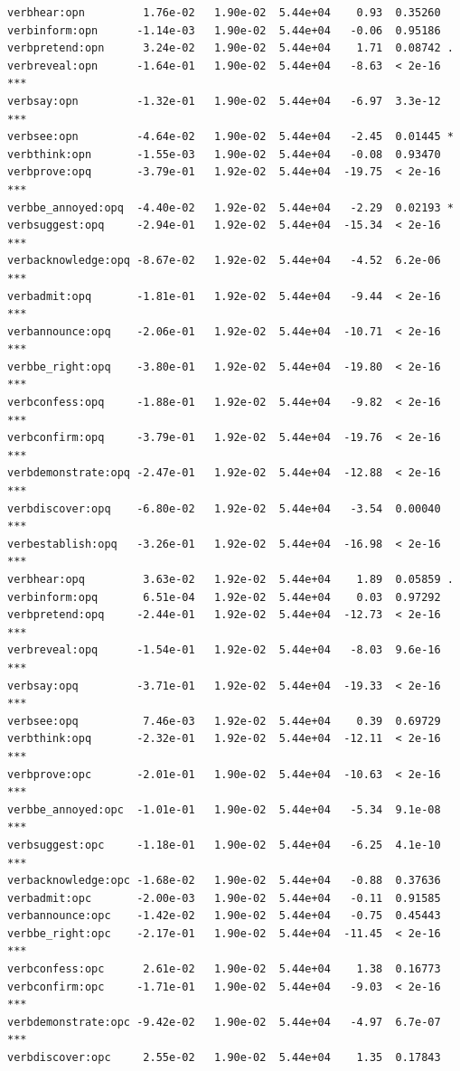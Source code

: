 \documentclass[10pt]{article}\usepackage[]{graphicx}\usepackage[dvipsnames]{xcolor}
\makeatletter
\newenvironment{kframe}{%
 \def\at@end@of@kframe{}%
 \ifinner\ifhmode%
  \def\at@end@of@kframe{\end{minipage}}%
  \begin{minipage}{\columnwidth}%
 \fi\fi%
 \def\FrameCommand##1{\hskip\@totalleftmargin \hskip-\fboxsep
 \colorbox{shadecolor}{##1}\hskip-\fboxsep
     \hskip-\linewidth \hskip-\@totalleftmargin \hskip\columnwidth}%
 \MakeFramed {\advance\hsize-\width
   \@totalleftmargin\z@ \linewidth\hsize
   \@setminipage}}%
 {\par\unskip\endMakeFramed%
 \at@end@of@kframe}
\newenvironment{knitrout}{}{} %
\makeatother
\begin{document}
\begin{knitrout}
\begin{kframe}
\begin{verbatim}
verbhear:opn         1.76e-02   1.90e-02  5.44e+04    0.93  0.35260    
verbinform:opn      -1.14e-03   1.90e-02  5.44e+04   -0.06  0.95186    
verbpretend:opn      3.24e-02   1.90e-02  5.44e+04    1.71  0.08742 .  
verbreveal:opn      -1.64e-01   1.90e-02  5.44e+04   -8.63  < 2e-16 ***
verbsay:opn         -1.32e-01   1.90e-02  5.44e+04   -6.97  3.3e-12 ***
verbsee:opn         -4.64e-02   1.90e-02  5.44e+04   -2.45  0.01445 *  
verbthink:opn       -1.55e-03   1.90e-02  5.44e+04   -0.08  0.93470    
verbprove:opq       -3.79e-01   1.92e-02  5.44e+04  -19.75  < 2e-16 ***
verbbe_annoyed:opq  -4.40e-02   1.92e-02  5.44e+04   -2.29  0.02193 *  
verbsuggest:opq     -2.94e-01   1.92e-02  5.44e+04  -15.34  < 2e-16 ***
verbacknowledge:opq -8.67e-02   1.92e-02  5.44e+04   -4.52  6.2e-06 ***
verbadmit:opq       -1.81e-01   1.92e-02  5.44e+04   -9.44  < 2e-16 ***
verbannounce:opq    -2.06e-01   1.92e-02  5.44e+04  -10.71  < 2e-16 ***
verbbe_right:opq    -3.80e-01   1.92e-02  5.44e+04  -19.80  < 2e-16 ***
verbconfess:opq     -1.88e-01   1.92e-02  5.44e+04   -9.82  < 2e-16 ***
verbconfirm:opq     -3.79e-01   1.92e-02  5.44e+04  -19.76  < 2e-16 ***
verbdemonstrate:opq -2.47e-01   1.92e-02  5.44e+04  -12.88  < 2e-16 ***
verbdiscover:opq    -6.80e-02   1.92e-02  5.44e+04   -3.54  0.00040 ***
verbestablish:opq   -3.26e-01   1.92e-02  5.44e+04  -16.98  < 2e-16 ***
verbhear:opq         3.63e-02   1.92e-02  5.44e+04    1.89  0.05859 .  
verbinform:opq       6.51e-04   1.92e-02  5.44e+04    0.03  0.97292    
verbpretend:opq     -2.44e-01   1.92e-02  5.44e+04  -12.73  < 2e-16 ***
verbreveal:opq      -1.54e-01   1.92e-02  5.44e+04   -8.03  9.6e-16 ***
verbsay:opq         -3.71e-01   1.92e-02  5.44e+04  -19.33  < 2e-16 ***
verbsee:opq          7.46e-03   1.92e-02  5.44e+04    0.39  0.69729    
verbthink:opq       -2.32e-01   1.92e-02  5.44e+04  -12.11  < 2e-16 ***
verbprove:opc       -2.01e-01   1.90e-02  5.44e+04  -10.63  < 2e-16 ***
verbbe_annoyed:opc  -1.01e-01   1.90e-02  5.44e+04   -5.34  9.1e-08 ***
verbsuggest:opc     -1.18e-01   1.90e-02  5.44e+04   -6.25  4.1e-10 ***
verbacknowledge:opc -1.68e-02   1.90e-02  5.44e+04   -0.88  0.37636    
verbadmit:opc       -2.00e-03   1.90e-02  5.44e+04   -0.11  0.91585    
verbannounce:opc    -1.42e-02   1.90e-02  5.44e+04   -0.75  0.45443    
verbbe_right:opc    -2.17e-01   1.90e-02  5.44e+04  -11.45  < 2e-16 ***
verbconfess:opc      2.61e-02   1.90e-02  5.44e+04    1.38  0.16773    
verbconfirm:opc     -1.71e-01   1.90e-02  5.44e+04   -9.03  < 2e-16 ***
verbdemonstrate:opc -9.42e-02   1.90e-02  5.44e+04   -4.97  6.7e-07 ***
verbdiscover:opc     2.55e-02   1.90e-02  5.44e+04    1.35  0.17843    

\end{verbatim}
\end{kframe}
\end{knitrout}
\end{document}
